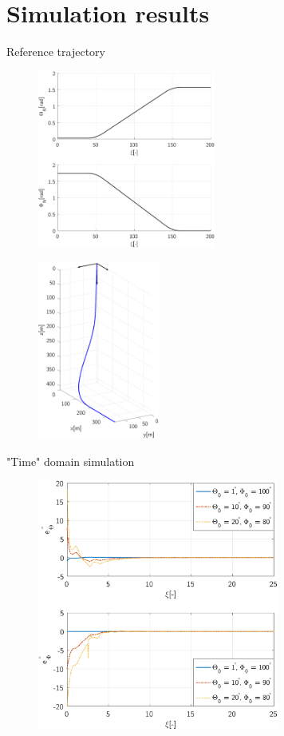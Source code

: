 \documentclass{beamer}
\begin{document}
\section{Simulation results}

\begin{frame}{Reference trajectory}
\begin{figure}[t]
	\centering
	\begin{minipage}[b]{0.5\textwidth}
		\centering
		\includegraphics[height=2.3in]{ReferenceTrajectoryThetaPhi.pdf}
		\label{fig:ReferenceTrajectoryThetaPhi} 
	\end{minipage}
	\begin{minipage}[b]{0.45\textwidth}
		\centering
		\includegraphics[height=2.3in]{ReferenceTrajectory.pdf}
		\label{fig:ReferenceTrajectoryV} 
	\end{minipage}
\end{figure}
\end{frame}

\begin{frame}{"Time" domain simulation}
\begin{figure}[H]
		\includegraphics[height=3.25in]{ErrorsNeutral.pdf}
\end{figure}
\end{frame}
\end{document}
